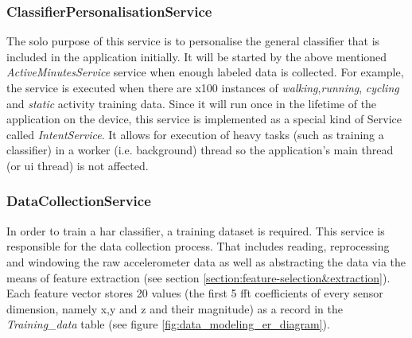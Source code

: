             \subsubsection{ClassifierPersonalisationService}
            The solo purpose of this service is to personalise the general classifier that is included in the application initially. It will be started by the above mentioned \textit{ActiveMinutesService} service when enough labeled data is collected. For example, the service is executed when there are x100 instances of \textit{walking},\textit{running}, \textit{cycling} and \textit{static} activity training data. Since it will run once in the lifetime of the application on the device, this service is implemented as a special kind of Service called \textit{IntentService}. It allows for execution of heavy tasks (such as training a classifier) in a worker (i.e. background) thread so the application's main thread (or \gls{ui} thread) is not affected.
            
            \subsubsection{DataCollectionService}
            In order to train a \gls{har} classifier, a training dataset is required. This service is responsible for the data collection process. That includes reading, reprocessing and windowing the raw accelerometer data as well as abstracting the data via the means of feature extraction (see section \ref{section:feature-selection&extraction}). Each feature vector stores 20 values (the first 5 \gls{fft} coefficients of every sensor dimension, namely x,y and z and their magnitude) as a record in the \textit{Training\_data} table (see figure \ref{fig:data_modeling_er_diagram}).
            

